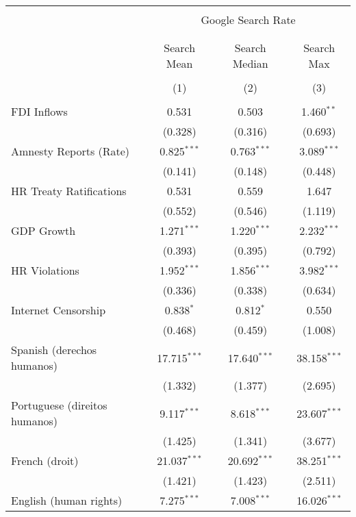
\begin{table}[!htbp] \centering 
  \caption{} 
  \label{} 
\begin{tabular}{@{\extracolsep{5pt}}lccc} 
\\[-1.8ex]\hline 
\hline \\[-1.8ex] 
 & \multicolumn{3}{c}{Google Search Rate} \\ 
\cline{2-4} 
\\[-1.8ex] & \multicolumn{3}{c}{ } \\ 
 & Search Mean & Search Median & Search Max \\ 
\\[-1.8ex] & (1) & (2) & (3)\\ 
\hline \\[-1.8ex] 
 FDI Inflows & 0.531 & 0.503 & 1.460$^{**}$ \\ 
  & (0.328) & (0.316) & (0.693) \\ 
  Amnesty Reports (Rate) & 0.825$^{***}$ & 0.763$^{***}$ & 3.089$^{***}$ \\ 
  & (0.141) & (0.148) & (0.448) \\ 
  HR Treaty Ratifications & 0.531 & 0.559 & 1.647 \\ 
  & (0.552) & (0.546) & (1.119) \\ 
  GDP Growth & 1.271$^{***}$ & 1.220$^{***}$ & 2.232$^{***}$ \\ 
  & (0.393) & (0.395) & (0.792) \\ 
  HR Violations & 1.952$^{***}$ & 1.856$^{***}$ & 3.982$^{***}$ \\ 
  & (0.336) & (0.338) & (0.634) \\ 
  Internet Censorship & 0.838$^{*}$ & 0.812$^{*}$ & 0.550 \\ 
  & (0.468) & (0.459) & (1.008) \\ 
  Spanish (derechos humanos) & 17.715$^{***}$ & 17.640$^{***}$ & 38.158$^{***}$ \\ 
  & (1.332) & (1.377) & (2.695) \\ 
  Portuguese (direitos humanos) & 9.117$^{***}$ & 8.618$^{***}$ & 23.607$^{***}$ \\ 
  & (1.425) & (1.341) & (3.677) \\ 
  French (droit) & 21.037$^{***}$ & 20.692$^{***}$ & 38.251$^{***}$ \\ 
  & (1.421) & (1.423) & (2.511) \\ 
  English (human rights) & 7.275$^{***}$ & 7.008$^{***}$ & 16.026$^{***}$ \\ 

\end{tabular}
\end{table}
